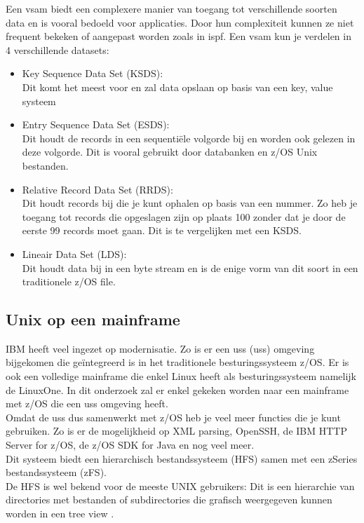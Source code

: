 Een \acrshort{vsam} biedt een complexere manier van toegang tot verschillende soorten data en is vooral bedoeld voor applicaties. Door hun complexiteit kunnen ze niet frequent bekeken of aangepast worden zoals in \acrshort{ispf}. Een \acrshort{vsam} kun je verdelen in 4 verschillende datasets:
\begin{itemize}
    \item Key Sequence Data Set (KSDS): \\Dit komt het meest voor en zal data opslaan op basis van een key, value systeem
    \item Entry Sequence Data Set (ESDS): \\Dit houdt de records in een sequentiële volgorde bij en worden ook gelezen in deze volgorde. Dit is vooral gebruikt door databanken en z/OS Unix bestanden.
    \item Relative Record Data Set (RRDS): \\Dit houdt records bij die je kunt ophalen op basis van een nummer. Zo heb je toegang tot records die opgeslagen zijn op plaats 100 zonder dat je door de eerste 99 records moet gaan. Dit is te vergelijken met een KSDS.
    \item Lineair Data Set (LDS): \\Dit houdt data bij in een byte stream en is de enige vorm van dit soort in een traditionele z/OS file.
\end{itemize}
\autocite{IBM}
\subsection{Unix op een mainframe}
IBM heeft veel ingezet op modernisatie. Zo is er een \acrlong{uss} (\acrshort{uss}) omgeving bijgekomen die geïntegreerd is in het traditionele besturingssysteem z/OS. Er is ook een volledige mainframe die enkel Linux heeft als besturingssysteem namelijk de LinuxOne. In dit onderzoek zal er enkel gekeken worden naar een mainframe met z/OS die een \acrshort{uss} omgeving heeft. \\

Omdat de \acrshort{uss} dus samenwerkt met z/OS heb je veel meer functies die je kunt gebruiken. Zo is er de mogelijkheid op XML parsing, OpenSSH, de IBM HTTP Server for z/OS, de z/OS SDK for Java en nog veel meer. \autocite{Dhawan2013} \\
 
Dit systeem biedt een hierarchisch bestandssysteem (HFS) samen met een zSeries bestandssysteem (zFS). \autocite{Precisely2020} \\ De HFS is wel bekend voor de meeste UNIX gebruikers: Dit is een hierarchie van directories met bestanden of subdirectories die grafisch weergegeven kunnen worden in een tree view \autocite{HCLTechnologies2022}. \\ 


